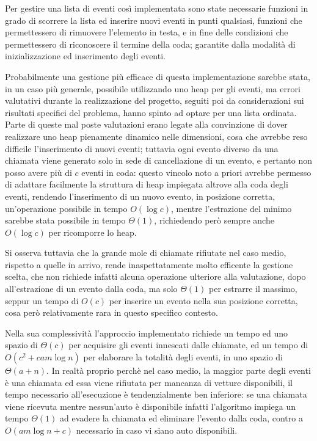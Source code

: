 \documentclass[a4paper,11pt]{Article}
\begin{document}
Per gestire una lista di eventi così implementata sono state necessarie funzioni in grado di scorrere la lista ed inserire nuovi eventi in punti qualsiasi, funzioni che permettessero di rimuovere l'elemento in testa, e in fine delle condizioni che permettessero di riconoscere il termine della coda; garantite dalla modalità di inizializzazione ed inserimento degli eventi.

Probabilmente una gestione più efficace di questa implementazione sarebbe stata, in un caso più generale, possibile utilizzando uno heap per gli eventi, ma errori valutativi durante la realizzazione del progetto, seguiti poi da considerazioni sui risultati specifici del problema, hanno spinto ad optare per una lista ordinata. Parte di queste mal poste valutazioni erano legate alla convinzione di dover realizzare uno heap pienamente dinamico nelle dimensioni, cosa che avrebbe reso difficile l'inserimento di nuovi eventi; tuttavia ogni evento diverso da una chiamata viene generato solo in sede di cancellazione di un evento, e pertanto non posso avere più di $c$ eventi in coda: questo vincolo noto a priori avrebbe permesso di adattare facilmente la struttura di heap impiegata altrove alla coda degli eventi, rendendo l'inserimento di un nuovo evento, in posizione corretta, un'operazione possibile in tempo $O(\log{c})$, mentre l'estrazione del minimo sarebbe stata possibile in tempo $\Theta(1)$, richiedendo però sempre anche $O(\log{c})$ per ricomporre lo heap.

Si osserva tuttavia che la grande mole di chiamate rifiutate nel caso medio, rispetto a quelle in arrivo, rende inaspettatamente molto efficente la gestione scelta, che non richiede infatti alcuna operazione ulteriore alla valutazione, dopo all'estrazione di un evento dalla coda, ma solo $\Theta(1)$ per estrarre il massimo, seppur un tempo di $O(c)$ per inserire un evento nella sua posizione corretta, cosa però relativamente rara in questo specifico contesto.

Nella sua complessività l'approccio implementato richiede un tempo ed uno spazio di $\Theta(c)$ per acquisire gli eventi innescati dalle chiamate, ed un tempo di  $O(c^2 + cam\log{n})$ per elaborare la totalità degli eventi, in uno spazio di  $\Theta(a + n)$.
In realtà proprio perchè nel caso medio, la maggior parte degli eventi è una chiamata ed essa viene rifiutata per mancanza di vetture disponibili, il tempo necessario all'esecuzione è tendenzialmente ben inferiore: se una chiamata viene ricevuta mentre nessun'auto è disponibile infatti l'algoritmo impiega un tempo $\Theta(1)$ ad evadere la chiamata ed eliminare l'evento dalla coda, contro a $O(am\log{n} + c)$ necessario in caso vi siano auto disponibili.
\end{document}
